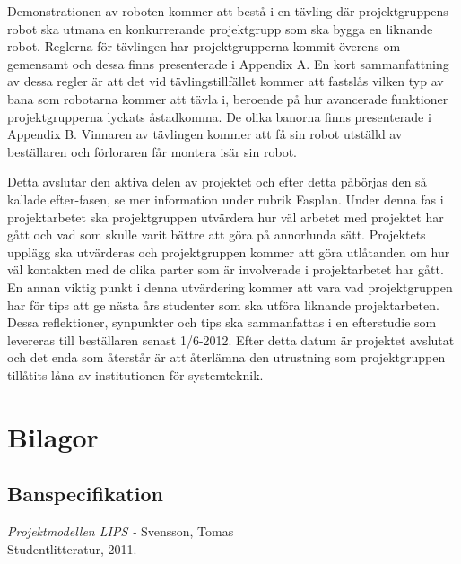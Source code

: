 \documentclass[a4paper,12pt]{article}
\begin{document}
Demonstrationen av roboten kommer att bestå i en tävling där projektgruppens robot ska utmana en konkurrerande projektgrupp som ska bygga en liknande robot. Reglerna för tävlingen har projektgrupperna kommit överens om gemensamt och dessa finns presenterade i Appendix A. En kort sammanfattning av dessa regler är att det vid tävlingstillfället kommer att fastslås vilken typ av bana som robotarna kommer att tävla i, beroende på hur avancerade funktioner projektgrupperna lyckats åstadkomma. De olika banorna finns presenterade i Appendix B. Vinnaren av tävlingen kommer att få sin robot utställd av beställaren och förloraren får montera isär sin robot.

Detta avslutar den aktiva delen av projektet och efter detta påbörjas den så kallade efter-fasen, se mer information under rubrik Fasplan. Under denna fas i projektarbetet ska  projektgruppen utvärdera hur väl arbetet med projektet har gått och vad som skulle varit bättre att göra på annorlunda sätt. Projektets upplägg ska utvärderas och projektgruppen kommer att göra utlåtanden om hur väl kontakten med de olika parter som är involverade i projektarbetet har gått. En annan viktig punkt i denna utvärdering kommer att vara vad projektgruppen har för tips att ge nästa års studenter som ska utföra liknande projektarbeten. Dessa reflektioner, synpunkter och tips ska sammanfattas i en efterstudie som levereras till beställaren senast 1/6-2012. Efter detta datum är projektet avslutat och det enda som återstår är att återlämna den utrustning som projektgruppen tillåtits låna av institutionen för systemteknik.


\newpage
\appendix
\section{Bilagor} \label{app:rules}


\subsection{Banspecifikation} \label{app:bana}

\newpage


\begin{thebibliography}{99}
\textit{Projektmodellen LIPS - } Svensson, Tomas
\\Studentlitteratur, 2011.
\end{thebibliography}
\end{document}
